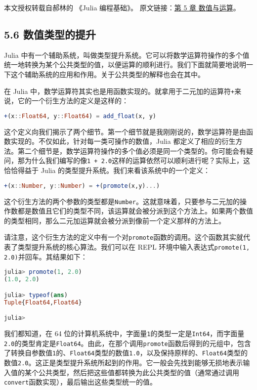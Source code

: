 
本文授权转载自郝林的 《Julia 编程基础》。 原文链接：\href{https://github.com/hyper0x/JuliaBasics/blob/master/book/ch05.md}{第 5 章 数值与运算}。


\subsection{5.6 数值类型的提升}

Julia 中有一个辅助系统，叫做类型提升系统。它可以将数学运算符操作的多个值统一地转换为某个公共类型的值，以便运算的顺利进行。我们下面就简要地说明一下这个辅助系统的应用和作用。关于公共类型的解释也会在其中。

在 Julia 中，数学运算符其实也是用函数实现的。就拿用于二元加的运算符\verb`+`来说，它的一个衍生方法的定义是这样的：
\begin{lstlisting}[language=julia]
+(x::Float64, y::Float64) = add_float(x, y)
\end{lstlisting}

这个定义向我们揭示了两个细节。第一个细节就是我刚刚说的，数学运算符是由函数实现的。不仅如此，针对每一类可操作的数值，Julia 都定义了相应的衍生方法。第二个细节是，数学运算符操作的多个值必须是同一个类型的。你可能会有疑问，那为什么我们编写的像\verb`1 + 2.0`这样的运算依然可以顺利进行呢？实际上，这恰恰得益于 Julia 的类型提升系统。我们来看该系统中的一个定义：
\begin{lstlisting}[language=julia]
+(x::Number, y::Number) = +(promote(x,y)...)
\end{lstlisting}

这个衍生方法的两个参数的类型都是\verb`Number`。这就意味着，只要参与二元加的操作数都是数值且它们的类型不同，该运算就会被分派到这个方法上。如果两个数值的类型相同，那么二元加运算就会被分派到像前一个定义那样的方法上。

请注意，这个衍生方法的定义中有一个对\verb`promote`函数的调用。这个函数其实就代表了类型提升系统的核心算法。我们可以在 REPL 环境中输入表达式\verb`promote(1, 2.0)`并回车。其结果如下：
\begin{lstlisting}[language=julia]
julia> promote(1, 2.0)
(1.0, 2.0)

julia> typeof(ans)
Tuple{Float64,Float64}

julia> 
\end{lstlisting}

我们都知道，在 64 位的计算机系统中，字面量\verb`1`的类型一定是\verb`Int64`，而字面量\verb`2.0`的类型肯定是\verb`Float64`。由此，在那个调用\verb`promote`函数后得到的元组中，包含了转换自参数值\verb`1`的、\verb`Float64`类型的数值\verb`1.0`，以及保持原样的、\verb`Float64`类型的数值\verb`2.0`。这正是类型提升系统所起到的作用。它一般会先找到能够无损地表示输入值的某个公共类型，然后把这些值都转换为此公共类型的值（通常通过调用\verb`convert`函数实现），最后输出这些类型统一的值。

